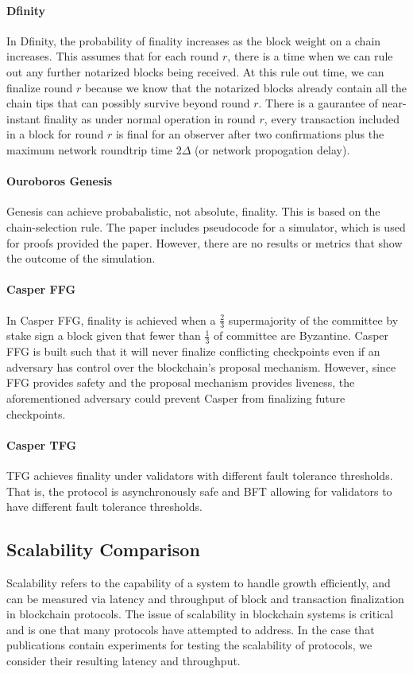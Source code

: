 \documentclass[10pt,journal,compsoc]{IEEEtran}
\newcommand\alberto[1]{\todo[color=yellow,inline]{\textbf{Alberto:} #1}}
\begin{document}
\paragraph{Dfinity}
In Dfinity, the probability of finality increases as the block weight on a chain increases. This assumes that for each round $r$, there is a time when we can rule out any further notarized blocks being received. At this rule out time, we can finalize round $r$ because we know that the notarized blocks already contain all the chain tips that can possibly survive beyond round $r$. There is a gaurantee of near-instant finality as under normal operation in round $r$, every transaction included in a block for round $r$ is final for an observer after two confirmations plus the maximum network roundtrip time 2$\Delta$ (or network propogation delay).  
\paragraph{Ouroboros Genesis} Genesis can achieve probabalistic, not absolute, finality. This is based on the chain-selection rule. The paper includes pseudocode for a simulator, which is used for proofs provided the paper. However, there are no results or metrics that show the outcome of the simulation. 

\paragraph{Casper FFG} In Casper FFG, finality is achieved when a \(\frac{2}{3}\) supermajority of the committee by stake sign a block given that fewer than \(\frac{1}{3}\) of committee are Byzantine. Casper FFG is built such that it will never finalize conflicting checkpoints even if an adversary has control over the blockchain's proposal mechanism. However, since FFG provides safety and the proposal mechanism provides liveness, the aforementioned adversary could prevent Casper from finalizing future checkpoints.

\paragraph{Casper TFG} TFG achieves finality under validators with different fault tolerance thresholds. That is, the protocol is asynchronously safe and BFT allowing for validators to have different fault tolerance thresholds.

\subsection{Scalability Comparison}
Scalability refers to the capability of a system to handle growth efficiently, and can be measured via latency and throughput of block and transaction finalization in blockchain protocols. The issue of scalability in blockchain systems is critical and is one that many protocols have attempted to address. \alberto{Cite examples.} In the case that publications contain experiments for testing the scalability of protocols, we consider their resulting latency and throughput. 
\end{document}
